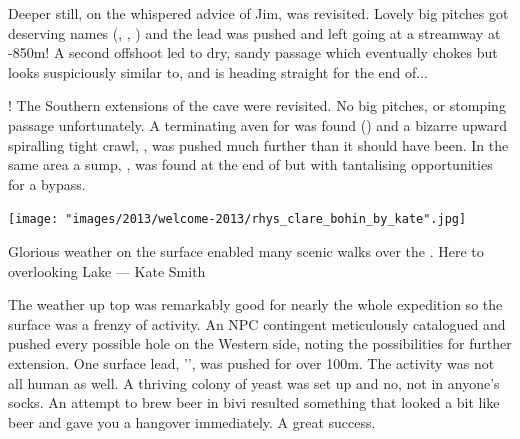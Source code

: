 Deeper still, on the whispered advice of Jim,  was revisited. Lovely big pitches got deserving names (, , ) and the lead was pushed and left going at a streamway at -850m! A second offshoot led to dry, sandy passage which eventually chokes but looks suspiciously similar to, and is heading straight for the end of...

! The Southern extensions of the cave were revisited. No big pitches, or stomping passage unfortunately. A terminating aven for  was found () and a bizarre upward spiralling tight crawl, , was pushed much further than it should have been. In the same area a sump, , was found at the end of  but with tantalising opportunities for a bypass.

\begin{marginfigure}
\texttt{[image: "images/2013/welcome-2013/rhys\_clare\_bohin\_by\_kate".jpg]}
\caption{Glorious weather on the surface enabled many scenic walks over the \protect{}. Here to \protect{} overlooking Lake \protect{} --- Kate Smith}
\label{fiona_surface}
\end{marginfigure}

The weather up top was remarkably good for nearly the whole expedition so the surface was a frenzy of activity. An NPC contingent meticulously catalogued and pushed every possible hole on the Western side, noting the possibilities for further extension. One surface lead, '', was pushed for over 100m. The activity was not all human as well. A thriving colony of yeast was set up and no, not in anyone’s socks. An attempt to brew beer in bivi resulted something that looked a bit like beer and gave you a hangover immediately. A great success.


